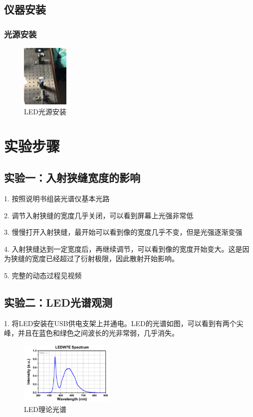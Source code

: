 \documentclass{ctexart}
\begin{document}
\subsection{仪器安装}
\subsubsection{光源安装}
\begin{figure}[htbp]
    \centering
    \includegraphics[width=0.2\textwidth,height=0.3\textwidth]{pictures/微信图片_20241107162037.jpg}
    \caption{LED光源安装}
\end{figure}
\section{实验步骤}

\subsection{实验一：入射狭缝宽度的影响}
1. 按照说明书组装光谱仪基本光路

2. 调节入射狭缝的宽度几乎关闭，可以看到屏幕上光强非常低

3. 慢慢打开入射狭缝，最开始可以看到像的宽度几乎不变，但是光强逐渐变强

4. 入射狭缝达到一定宽度后，再继续调节，可以看到像的宽度开始变大。这是因为狭缝的宽度已经超过了衍射极限，因此散射开始影响。

5. 完整的动态过程见视频
\subsection{实验二：LED光谱观测}
1. 将LED安装在USB供电支架上并通电。LED的光谱如图，可以看到有两个尖峰，并且在蓝色和绿色之间波长的光非常弱，几乎消失。
\begin{figure}[H]
    \centering
    \includegraphics[width=0.4\textwidth,height=0.2\textwidth]{pictures/光谱图.png}
    \caption{LED理论光谱}
\end{figure}
\end{document}
